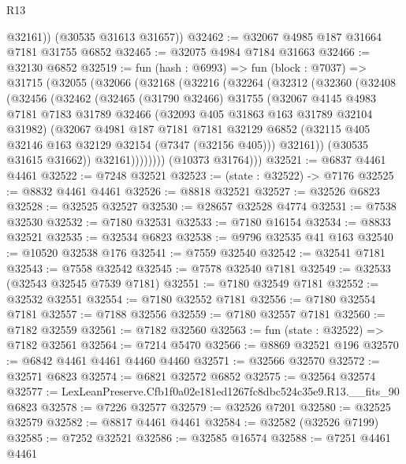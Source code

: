 \begin{lexlean}{R13}
\begin{coremodule}
          @32161))
      (@30535 @31613 @31657))
@32462 := @32067 @4985 @187 @31664 @7181 @31755 @6852
@32465 := @32075 @4984 @7184 @31663
@32466 := @32130 @6852
@32519 := fun (hash : @6993) =>
  fun (block : @7037) =>
  @31715
    (@32055
      (@32066
        (@32168
          (@32216
            (@32264
              (@32312
                (@32360
                  (@32408
                    (@32456
                      (@32462
                        (@32465
                          (@31790 @32466)
                          @31755
                          (@32067
                            @4145
                            @4983
                            @7181
                            @7183
                            @31789
                            @32466
                            (@32093 @405 @31863 @163 @31789 @32104 @31982)
                            (@32067
                              @4981
                              @187
                              @7181
                              @7181
                              @32129
                              @6852
                              (@32115 @405 @32146 @163 @32129 @32154 (@7347 (@32156 @405)))
                              @32161))
                          (@30535 @31615 @31662))
                        @32161))))))))
        (@10373 @31764)))
@32521 := @6837 @4461 @4461
@32522 := @7248 @32521
@32523 := (state : @32522) -> @7176
@32525 := @8832 @4461 @4461
@32526 := @8818 @32521
@32527 := @32526 @6823
@32528 := @32525 @32527
@32530 := @28657 @32528 @4774
@32531 := @7538 @32530
@32532 := @7180 @32531
@32533 := @7180 @16154
@32534 := @8833 @32521
@32535 := @32534 @6823
@32538 := @9796 @32535 @41 @163
@32540 := @10520 @32538 @176
@32541 := @7559 @32540
@32542 := @32541 @7181
@32543 := @7558 @32542
@32545 := @7578 @32540 @7181
@32549 := @32533 (@32543 @32545 @7539 @7181)
@32551 := @7180 @32549 @7181
@32552 := @32532 @32551
@32554 := @7180 @32552 @7181
@32556 := @7180 @32554 @7181
@32557 := @7188 @32556
@32559 := @7180 @32557 @7181
@32560 := @7182 @32559
@32561 := @7182 @32560
@32563 := fun (state : @32522) => @7182 @32561
@32564 := @7214 @5470
@32566 := @8869 @32521 @196
@32570 := @6842 @4461 @4461 @4460 @4460
@32571 := @32566 @32570
@32572 := @32571 @6823
@32574 := @6821 @32572 @6852
@32575 := @32564 @32574
@32577 := LexLeanPreserve.Cfb1f0a02e181ed1267fc8dbc524c35e9.R13.__fits_90 @6823
@32578 := @7226 @32577
@32579 := @32526 @7201
@32580 := @32525 @32579
@32582 := @8817 @4461 @4461
@32584 := @32582 (@32526 @7199)
@32585 := @7252 @32521
@32586 := @32585 @16574
@32588 := @7251 @4461 @4461

\end{coremodule}
\end{lexlean}
